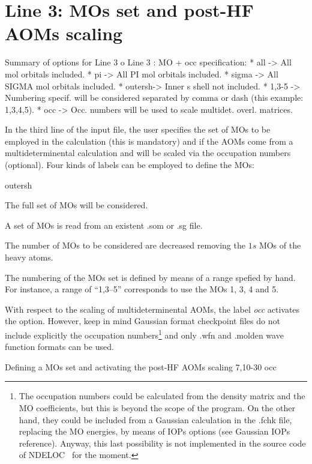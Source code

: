 \documentclass[a4paper,11pt,openany]{memoir}
\newcommand\programa{\textsc{NDELOC}}
\begin{document}
\section{Line 3: \acp{MO} set and post-HF \acp{AOM} scaling}\label{sec:line3}
\begin{recuadro}{Summary of options for Line 3}
o Line 3 :  MO + occ        specification:
 *  all    -> All mol orbitals included.
 *  pi     -> All PI    mol orbitals included.
 *  sigma  -> All SIGMA mol orbitals included.
 *  outersh-> Inner s shell not included.
 *  1,3-5  -> Numbering specif. will be considered separated by comma or dash
              (this example: 1,3,4,5).
 *  occ    -> Occ. numbers will be used to scale multidet. overl. matrices.
\end{recuadro}
In the third line of the input file, the user specifies the set of \acp{MO} to be employed in the calculation (this is mandatory) and if the \acp{AOM} come from a multideterminental calculation and will be scaled via the occupation numbers (optional). Four kinds of labels can be employed to define the \acp{MO}:
\begin{labeling}{outersh}
	\item[all] The full set of \acp{MO} will be considered.
	\item[pi] A set of \acp{MO} is read from an existent .som or .sg file.
	\item[outersh] The number of \acp{MO} to be considered are decreased removing the $1s$ \acp{MO} of the heavy atoms.
	\item[\emph{range}] The numbering of the \acp{MO} set is defined by means of a range spefied by hand. For instance, a range of ``1,3--5'' corresponds to use the \acp{MO} 1, 3, 4 and 5.
\end{labeling}

With respect to the scaling of multideterminental \acp{AOM}, the label \emph{occ} activates the option. However, keep in mind Gaussian format checkpoint files do not include explicitly the occupation numbers\footnote{The occupation numbers could be calculated from the density matrix and the \ac{MO} coefficients, but this is beyond the scope of the program. On the other hand, they could be included from a Gaussian calculation in the .fchk file, replacing the \ac{MO} energies, by means of IOPs options (see Gaussian IOPs reference). Anyway, this last possibility is not implemented in the source code of \programa~ for the moment.} and only .wfn and .molden wave function formats can be used.
\begin{myexample}{Defining a \acp{MO} set and activating the post-HF \acp{AOM} scaling}
	7,10-30 occ
\end{myexample}
\end{document}
